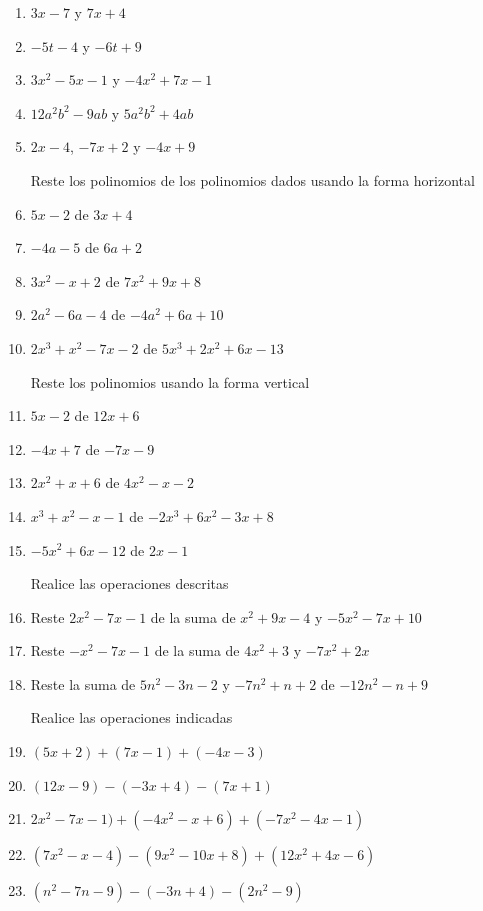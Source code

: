 \documentclass[letterpaper,11pt,twoside]{article}
\begin{document}
\begin{multicols}{2}
\begin{enumerate}
\item $3x-7$ \hspace*{.5cm} y \hspace*{.5cm} $7x+4$
\item $-5t-4$ \hspace*{.5cm} y \hspace*{.5cm} $-6t+9$
\item $3x^{2}-5x-1$ \hspace*{.5cm} y \hspace*{.5cm} $-4x^{2}+7x-1$
\item $12a^{2}b^{2}-9ab$ \hspace*{.5cm} y \hspace*{.5cm} $5a^{2}b^{2}+4ab$
\item $2x-4$,\hspace*{.5cm} $-7x+2$ \hspace*{.5cm} y \hspace*{.5cm} $-4x+9$

Reste los polinomios de los polinomios dados usando la forma horizontal

\item $5x-2$ de $3x+4$
\item $-4a-5$ de $6a+2$
\item $3x^{2}-x+2$ de $7x^{2}+9x+8$
\item $2a^{2}-6a-4$ de $-4a^{2}+6a+10$
\item $2x^{3}+x^{2}-7x-2$ de $5x^{3}+2x^{2}+6x-13$

Reste los polinomios usando la forma vertical

\item $5x-2$ de $12x+6$
\item $-4x+7$ de $-7x-9$
\item $2x^{2}+x+6$ de $4x^{2}-x-2$
\item $x^{3}+x^{2}-x-1$ de $-2x^{3}+6x^{2}-3x+8$
\item $-5x^{2}+6x-12$ de $2x-1$

Realice las operaciones descritas

\item Reste $2x^{2}-7x-1$ de la suma de $x^{2}+9x-4$ y $-5x^{2}-7x+10$
\item Reste $-x^{2}-7x-1$ de la suma de $4x^{2}+3$ y $-7x^{2}+2x$
\item Reste la suma de $5n^{2}-3n-2$ y $-7n^{2}+n+2$ de $-12n^{2}-n+9$

Realice las operaciones indicadas

\item $(5x+2)+(7x-1)+(-4x-3)$
\item $(12x-9)-(-3x+4)-(7x+1)$
\item $2x^{2}-7x-1)+(-4x^{2}-x+6)+(-7x^{2}-4x-1)$
\item $(7x^{2}-x-4)-(9x^{2}-10x+8)+(12x^{2}+4x-6)$
\item $(n^{2}-7n-9)-(-3n+4)-(2n^{2}-9)$


\end{enumerate}
\end{multicols}
\end{document}
